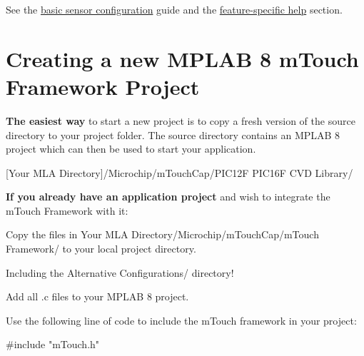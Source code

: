 See the \hyperlink{featBasic}{basic sensor configuration} guide and the \hyperlink{FrameworkFeatures}{feature-\/specific help} section. \hypertarget{GettingStartedNewP8}{}\section{Creating a new M\+P\+L\+A\+B 8 m\+Touch Framework Project}\label{GettingStartedNewP8}
{\bfseries The easiest way} to start a new project is to copy a fresh version of the source directory to your project folder. The source directory contains an M\+P\+L\+A\+B 8 project which can then be used to start your application. \begin{DoxyItemize}
\item {\ttfamily \mbox{[}Your M\+L\+A Directory\mbox{]}/\+Microchip/m\+Touch\+Cap/\+P\+I\+C12\+F P\+I\+C16\+F C\+V\+D Library/}\end{DoxyItemize}
{\bfseries If you already have an application project} and wish to integrate the m\+Touch Framework with it\+: 
\begin{DoxyEnumerate}
\item Copy the files in {\ttfamily Your M\+L\+A Directory/\+Microchip/m\+Touch\+Cap/m\+Touch Framework/} to your local project directory. 
\begin{DoxyItemize}
\item Including the {\ttfamily Alternative Configurations/} directory! 
\end{DoxyItemize}


\item Add all {\ttfamily .c} files to your M\+P\+L\+A\+B 8 project.


\item Use the following line of code to include the m\+Touch framework in your project\+:~\newline
 
\begin{DoxyCode}
\textcolor{preprocessor}{#include "mTouch.h"}
\end{DoxyCode}
 
\end{DoxyEnumerate}

